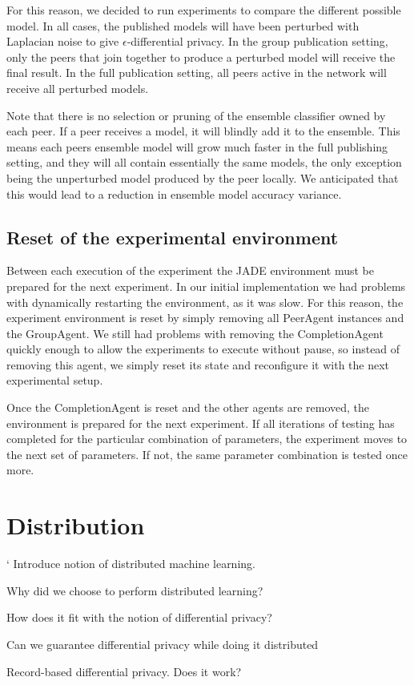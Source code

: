For this reason, we decided to run experiments to compare the different possible model. In all cases, the published models will have been perturbed with Laplacian noise to give $\epsilon$-differential privacy. In the group publication setting, only the peers that join together to produce a perturbed model will receive the final result. In the full publication setting, all peers active in the network will receive all perturbed models. 

Note that there is no selection or pruning of the ensemble classifier owned by each peer. If a peer receives a model, it will blindly add it to the ensemble. This means each peers ensemble model will grow much faster in the full publishing setting, and they will all contain essentially the same models, the only exception being the unperturbed model produced by the peer locally. We anticipated that this would lead to a reduction in ensemble model accuracy variance.


\subsection{Reset of the experimental environment}

Between each execution of the experiment the JADE environment must be prepared for the next experiment. In our initial implementation we had problems with dynamically restarting the environment, as it was slow. For this reason, the experiment environment is reset by simply removing all PeerAgent instances and the GroupAgent. We still had problems with removing the CompletionAgent quickly enough to allow the experiments to execute without pause, so instead of removing this agent, we simply reset its state and reconfigure it with the next experimental setup.

Once the CompletionAgent is reset and the other agents are removed, the environment is prepared for the next experiment. If all iterations of testing has completed for the particular combination of parameters, the experiment moves to the next set of parameters. If not, the same parameter combination is tested once more. 

\section{Distribution}`
Introduce notion of distributed machine learning. 

Why did we choose to perform distributed learning?

How does it fit with the notion of differential privacy?

Can we guarantee differential privacy while doing it distributed

Record-based differential privacy. Does it work?



\cleardoublepage